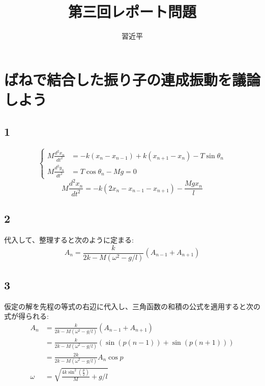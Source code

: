 \documentclass{jreport}
\begin{document}
\title{第三回レポート問題}
\author{習近平}
\maketitle
\setcounter{chapter}{3}
\newpage
\tableofcontents
{}
\newpage
\section{ばねで結合した振り子の連成振動を議論しよう}
\subsection{1}
\begin{equation}
	\left\{
	\begin{aligned}
		M\frac{d^2x_n}{dt^2} &= -k(x_n -x_{n-1}) + k(x_{n+1} -x_n) -T\sin \theta_n \\
		M\frac{d^2y_n}{dt^2} &= T\cos \theta_n -Mg =0
	\end{aligned}
	\right.
\end{equation}
\begin{equation}
	M\frac{d^2x_n}{dt^2} = -k(2x_n-x_{n-1}-x_{n+1})-\frac{Mgx_n}{l}
\end{equation}
\subsection{2}
代入して、整理すると次のように定まる:\\
\begin{equation}
	A_n = \frac{k}{2k-M(\omega^2 - g/l)} (A_{n-1} +A_{n+1})
\end{equation}
\subsection{3}
仮定の解を先程の等式の右辺に代入し、三角函数の和積の公式を適用すると次の式が得られる:\\
\begin{equation}
	\begin{aligned}
	  A_n &= \frac{k}{2k-M(\omega^2 - g/l)} (A_{n-1} +A_{n+1})\\
	      &= \frac{k}{2k-M(\omega^2 - g/l)} (\sin (p(n-1)) +\sin (p(n+1)))\\
	      &= \frac{2k}{2k-M(\omega^2 - g/l)} A_n\cos p \\
	  \omega &= \sqrt{\frac{4k\sin^2(\frac{p}{2})}{M} + g/l}
	\end{aligned}
\end{equation}
\end{document}
